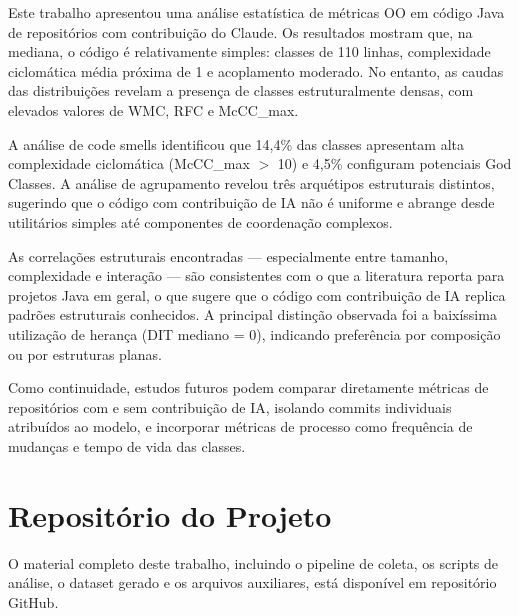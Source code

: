 \documentclass[12pt]{article}
\begin{document}
Este trabalho apresentou uma análise estatística de métricas OO em código Java de repositórios com contribuição do Claude. Os resultados mostram que, na mediana, o código é relativamente simples: classes de 110 linhas, complexidade ciclomática média próxima de 1 e acoplamento moderado. No entanto, as caudas das distribuições revelam a presença de classes estruturalmente densas, com elevados valores de WMC, RFC e McCC\_max.

A análise de code smells identificou que 14,4\% das classes apresentam alta complexidade ciclomática (McCC\_max $>$ 10) e 4,5\% configuram potenciais God Classes. A análise de agrupamento revelou três arquétipos estruturais distintos, sugerindo que o código com contribuição de IA não é uniforme e abrange desde utilitários simples até componentes de coordenação complexos.

As correlações estruturais encontradas — especialmente entre tamanho, complexidade e interação — são consistentes com o que a literatura reporta para projetos Java em geral, o que sugere que o código com contribuição de IA replica padrões estruturais conhecidos. A principal distinção observada foi a baixíssima utilização de herança (DIT mediano = 0), indicando preferência por composição ou por estruturas planas.

Como continuidade, estudos futuros podem comparar diretamente métricas de repositórios com e sem contribuição de IA, isolando commits individuais atribuídos ao modelo, e incorporar métricas de processo como frequência de mudanças e tempo de vida das classes.

\newpage
\section{Repositório do Projeto}

O material completo deste trabalho, incluindo o pipeline de coleta, os scripts de análise, o dataset gerado e os arquivos auxiliares, está disponível em repositório GitHub.
\end{document}
